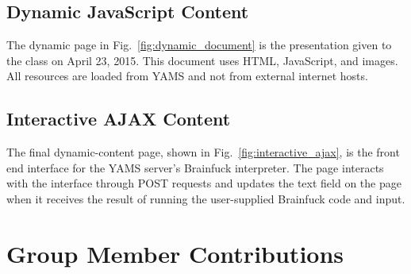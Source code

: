\documentclass[journal,10pt]{IEEEtran}
\begin{document}
\subsection{Dynamic JavaScript Content}

The dynamic page in Fig.~\ref{fig:dynamic_document} is the presentation given to
the class on April 23, 2015. This document uses HTML, JavaScript, and images.
All resources are loaded from YAMS and not from external internet hosts.

\subsection{Interactive AJAX Content}

The final dynamic-content page, shown in Fig.~\ref{fig:interactive_ajax}, is the
front end interface for the YAMS server's Brainfuck\cite{Mpreu/preller}
interpreter. The page interacts with the interface through POST requests and
updates the text field on the page when it receives the result of running the
user-supplied Brainfuck code and input.

\section{Group Member Contributions}
\end{document}
